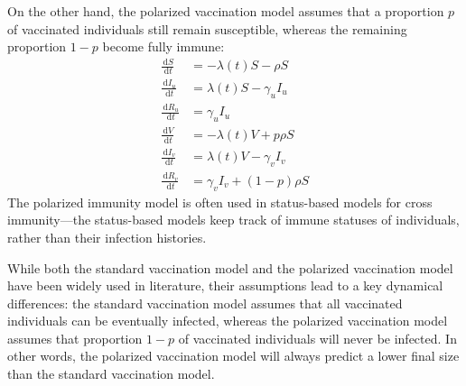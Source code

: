 \documentclass[12pt]{article}
\newcommand{\dd}[1]{\ensuremath{\, \mathrm{d}#1}}
\begin{document}
On the other hand, the polarized vaccination model assumes that a proportion $p$ of vaccinated individuals still remain susceptible, whereas the remaining proportion $1-p$ become fully immune: 
\begin{align}
\frac{\dd S}{\dd t} &= - \lambda(t) S - \rho S \\
\frac{\dd I_u}{\dd t} &= \lambda(t) S - \gamma_u I_u \\
\frac{\dd R_u}{\dd t} &= \gamma_u I_u \\
\frac{\dd V}{\dd t} &= - \lambda(t) V + p \rho S \\
\frac{\dd I_v}{\dd t} &= \lambda(t) V - \gamma_v I_v \\
\frac{\dd R_v}{\dd t} &= \gamma_v I_v + (1-p) \rho S
\end{align}
The polarized immunity model is often used in status-based models for cross immunity---the status-based models keep track of immune statuses of individuals, rather than their infection histories.

While both the standard vaccination model and the polarized vaccination model have been widely used in literature, their assumptions lead to a key dynamical differences: the standard vaccination model assumes that all vaccinated individuals can be eventually infected, whereas the polarized vaccination model assumes that proportion $1-p$ of vaccinated individuals will never be infected.
In other words, the polarized vaccination model will always predict a lower final size than the standard vaccination model.
\end{document}
